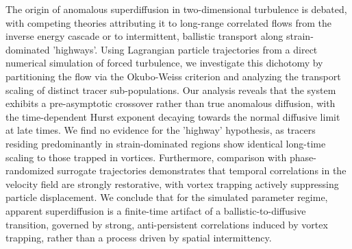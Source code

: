 \documentclass[]{article}
\begin{document}
The origin of anomalous superdiffusion in two-dimensional turbulence is debated, with competing theories attributing it to long-range correlated flows from the inverse energy cascade or to intermittent, ballistic transport along strain-dominated 'highways'. Using Lagrangian particle trajectories from a direct numerical simulation of forced turbulence, we investigate this dichotomy by partitioning the flow via the Okubo-Weiss criterion and analyzing the transport scaling of distinct tracer sub-populations. Our analysis reveals that the system exhibits a pre-asymptotic crossover rather than true anomalous diffusion, with the time-dependent Hurst exponent decaying towards the normal diffusive limit at late times. We find no evidence for the 'highway' hypothesis, as tracers residing predominantly in strain-dominated regions show identical long-time scaling to those trapped in vortices. Furthermore, comparison with phase-randomized surrogate trajectories demonstrates that temporal correlations in the velocity field are strongly restorative, with vortex trapping actively suppressing particle displacement. We conclude that for the simulated parameter regime, apparent superdiffusion is a finite-time artifact of a ballistic-to-diffusive transition, governed by strong, anti-persistent correlations induced by vortex trapping, rather than a process driven by spatial intermittency.
\end{document}
